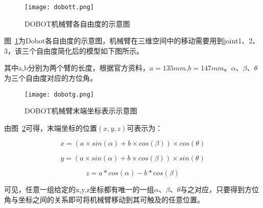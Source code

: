 \begin{figure}[htbp]
\small
\centering
\texttt{[image: dobott.png]}
\caption{DOBOT机械臂各自由度的示意图} 
\label{dobott}
\end{figure}

图~\ref{dobott}为Dobot各自由度的示意图，机械臂在三维空间中的移动需要用到joint1、2、3，该三个自由度简化后的模型如下图所示。

其中a,b分别为两个臂的长度，根据官方资料，$a=135mm$,$b=147mm$。$\alpha$、$\beta$、$\theta$ 为三个自由度对应的方位角。

\begin{figure}[htbp]
\small
\centering
\texttt{[image: dobotg.png]}
\caption{DOBOT机械臂末端坐标表示示意图} 
\label{dobotg}
\end{figure}

由图~\ref{dobotg}可得，末端坐标的位置$(x,y,z)$可表示为：

\begin{equation}
x=(a \times sin(\alpha)+b \times cos(\beta)) \times cos(\theta)
\end{equation}

\begin{equation}
y=(a \times sin(\alpha)+b \times cos(\beta)) \times sin(\theta)
\end{equation}

\begin{equation}
z=a*cos(\alpha)-b*cos(\beta)
\end{equation}

可见，任意一组给定的x,y,z坐标都有唯一的一组$\alpha$、$\beta$、$\theta$与之对应，只要得到方位角与坐标之间的关系即可将机械臂移动到其可触及的任意位置。

